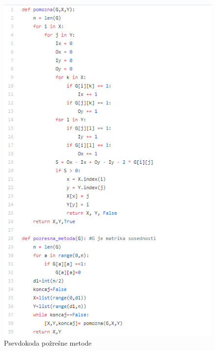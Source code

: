 \documentclass[12pt,a4paper]{amsart}
\theoremstyle{definition} %
\theoremstyle{plain} %
\begin{document}
\newpage
\FloatBarrier
\begin{figure}
  \centering
  \includegraphics{pozresna}
  \caption{Psevdokoda požrešne metode}
\end{figure}
\FloatBarrier 
\end{document}
